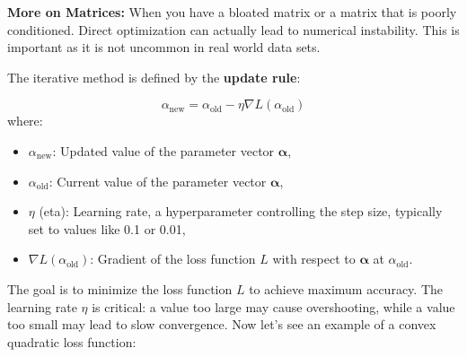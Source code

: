 \textbf{More on Matrices:} When you have a bloated matrix or a matrix that is poorly conditioned. Direct optimization can actually lead to numerical instability. This is important as it is not uncommon in real world data sets. 

The iterative method is defined by the \textbf{update rule}:

\begin{equation}
    \alpha_{\text{new}} = \alpha_{\text{old}} - \eta \nabla L(\alpha_{\text{old}})
\end{equation}
where:
\begin{itemize}
    \item \( \alpha_{\text{new}} \): Updated value of the parameter vector \( \boldsymbol{\alpha} \),
    \item \( \alpha_{\text{old}} \): Current value of the parameter vector \( \boldsymbol{\alpha} \),
    \item \( \eta \) (eta): Learning rate, a hyperparameter controlling the step size, typically set to values like 0.1 or 0.01,
    \item \( \nabla L(\alpha_{\text{old}}) \): Gradient of the loss function \( L \) with respect to \( \boldsymbol{\alpha} \) at \( \alpha_{\text{old}} \).
\end{itemize}

The goal is to minimize the loss function \( L \) to achieve maximum accuracy. The learning rate \( \eta \) is critical: a value too large may cause overshooting, while a value too small may lead to slow convergence. Now let's see an example of a convex quadratic loss function:

\begin{center}
\end{center}

